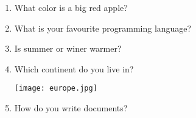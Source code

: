 \documentclass[12pt,onside,a4paper,article]{memoir}
\begin{document}
\begin{enumerate}\itemsep30mm




\item{What color is a big red apple?}
\begin{flushright}
\end{flushright}
\item{What is your favourite programming language?}
\begin{flushright}
\end{flushright}
\item{Is summer or winer warmer?}
\begin{flushright}
\end{flushright}
\item{Which continent do you live in?}
\begin{flushright}
\end{flushright}
\begin{flushleft}
\texttt{[image: europe.jpg]}
\end{flushleft}
\item{How do you write documents?}
\begin{flushright}
\end{flushright}
\end{enumerate}
\end{document}
